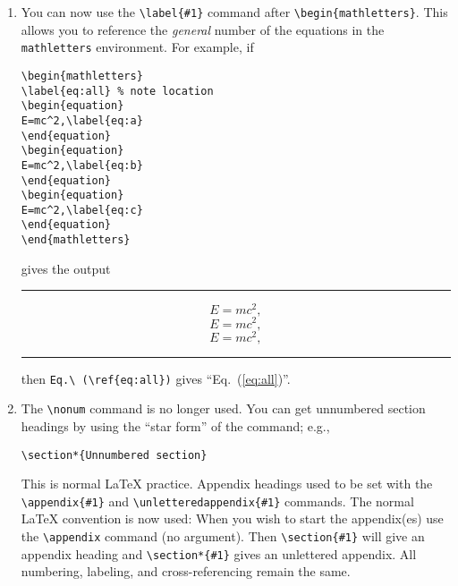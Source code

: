 \begin{enumerate}
\item You can now use the
\verb+\label{#1}+ command
after \verb+\begin{mathletters}+. This allows you to
reference the {\em general\/} number of the equations in the
\verb+mathletters+ environment. For example, if
\begin{verbatim}
\begin{mathletters}
\label{eq:all} % note location
\begin{equation}
E=mc^2,\label{eq:a}
\end{equation}
\begin{equation}
E=mc^2,\label{eq:b}
\end{equation}
\begin{equation}
E=mc^2,\label{eq:c}
\end{equation}
\end{mathletters}
\end{verbatim}
gives the output
\smallskip\hrule\smallskip
\begin{mathletters}
\label{eq:all}
\begin{equation}
E=mc^2,\label{eq:a}
\end{equation}
\begin{equation}
E=mc^2,\label{eq:b}
\end{equation}
\begin{equation}
E=mc^2,\label{eq:c}
\end{equation}
\end{mathletters}
\smallskip\hrule\smallskip
then \verb+Eq.\ (\ref{eq:all})+ gives ``Eq.\ (\ref{eq:all})''.


\item The \verb+\nonum+ command is no longer used. You can get unnumbered
section headings by using the ``star form'' of the command; e.g.,
\begin{verbatim}
\section*{Unnumbered section}
\end{verbatim}
This is normal \LaTeX{} practice. Appendix headings used to be set with the
\verb+\appendix{#1}+ and \verb+\unletteredappendix{#1}+ commands. The
normal \LaTeX{} convention is now used: When you wish to start the
appendix(es) use the \verb+\appendix+ command (no argument). Then
\verb+\section{#1}+ will give an appendix heading and \verb+\section*{#1}+
gives an unlettered appendix. All numbering, labeling, and
cross-referencing remain the same.


\end{enumerate}
